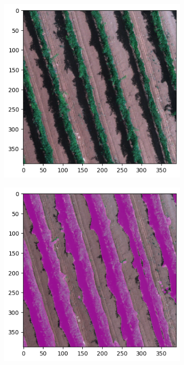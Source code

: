 \documentclass[comsoc,final]{IEEEtran}
\begin{document}
\begin{figure}{\centering%
%
      \begin{subfigure}[b]{0.47\columnwidth}
         \centering
         \includegraphics[width=\columnwidth]{vite}
         \caption{}
         \label{maskplot:a}
     \end{subfigure}%
%
     \begin{subfigure}[b]{0.47\columnwidth}
         \centering
         \includegraphics[width=\columnwidth]{vite_GT}

\end{subfigure}}
\end{figure}
\end{document}
